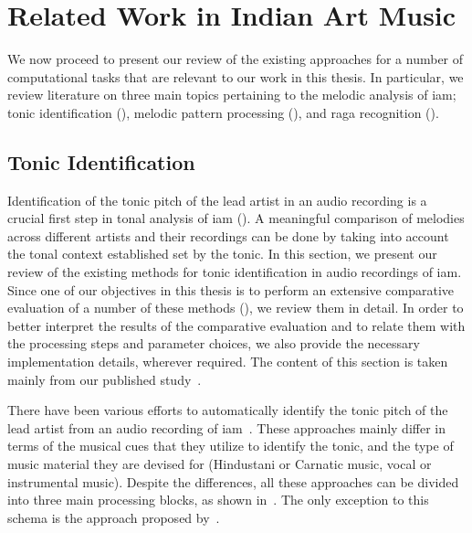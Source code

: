 \section{Related Work in Indian Art Music}
\label{sec:background_relevant_work_iam}

We now proceed to present our review of the existing approaches for a number of  computational tasks that are relevant to our work in this thesis. In particular, we review literature on three main topics pertaining to the melodic analysis of \gls{iam}; tonic identification (), melodic pattern processing (), and  \gls{raga} recognition ().  


\subsection{Tonic Identification}
\label{sec:background_relevant_work_tonic_identification}

Identification of the tonic pitch of the lead artist in an audio recording is a crucial first step in tonal analysis of \gls{iam} (). A meaningful comparison of melodies across different artists and their recordings can be done by taking into account the tonal context established set by the tonic. In this section, we present our review of the existing methods for tonic identification in audio recordings of \gls{iam}. Since one of our objectives in this thesis is to perform an extensive comparative evaluation of a number of these methods (), we review them in detail. In order to better interpret the results of the comparative evaluation and to relate them with the processing steps and parameter choices, we also provide the necessary implementation details, wherever required. The content of this section is taken mainly from our published study~\citep{Gulati2014Tonic}.

There have been various efforts to automatically identify the tonic pitch of the lead artist from an audio recording of \gls{iam}~\citep{salamon2012multipitch,gulati2012two,bellur2012knowledge,ranjani2011carnatic,Sengupta2005b,chordia2013joint}. These approaches mainly differ in terms of the musical cues that they utilize to identify the tonic, and the type of music material they are devised for (Hindustani or Carnatic music, vocal or
instrumental music). Despite the differences, all these approaches can be divided into three main processing blocks, as shown in~. The only exception to this schema is the approach proposed by~\cite{Sengupta2005b}. 

